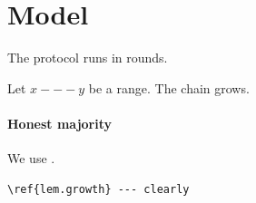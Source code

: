 \documentclass{llncs}
\begin{document}
\section{Model}\label{sec.model}
The \sysname{} protocol runs in rounds.
\begin{lemma}\label{lem.growth}
Let $x --- y$ be a range. The chain grows.
\end{lemma}
\paragraph{Honest majority} We use .
\begin{verbatim}
\ref{lem.growth} --- clearly
\end{verbatim}
\end{document}
